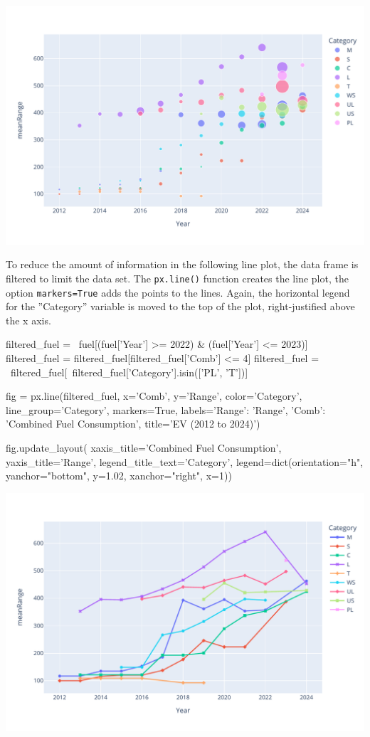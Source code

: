 \begin{center}
  \includegraphics[width=.8\textwidth]{px.fuel.pointsSize.pdf}
\end{center}

To reduce the amount of information in the following line plot, the data frame is filtered to limit the data set. The \texttt{px.line()} function creates the line plot, the option \texttt{markers=True} adds the points to the lines. Again, the horizontal legend for the ''Category'' variable is moved to the top of the plot, right-justified above the x axis.

\begin{samepage}
\begin{pythoncode}
filtered_fuel = \
    fuel[(fuel['Year'] >= 2022) & (fuel['Year'] <= 2023)]
filtered_fuel = filtered_fuel[filtered_fuel['Comb'] <= 4]
filtered_fuel = \
    filtered_fuel[~filtered_fuel['Category'].isin(['PL', 'T'])]

fig = px.line(filtered_fuel, 
    x='Comb', y='Range', color='Category', 
    line_group='Category', markers=True, 
    labels={'Range': 'Range', 'Comb': 'Combined Fuel Consumption'},
    title='EV (2012 to 2024)')

fig.update_layout(
    xaxis_title='Combined Fuel Consumption',
    yaxis_title='Range',
    legend_title_text='Category',
    legend=dict(orientation="h", yanchor="bottom", 
                y=1.02, xanchor="right", x=1))
\end{pythoncode}
\end{samepage}

\begin{center}
  \includegraphics[width=.8\textwidth]{px.fuel.linesPoints.pdf}
\end{center}

